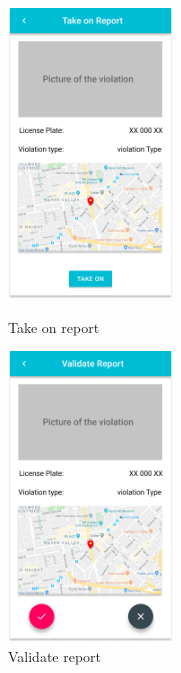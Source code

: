 \documentclass{article}
\begin{document}
\begin{figure}[!htb]
	\centering
	\begin{minipage}{.45\textwidth}
		\centering
		\includegraphics[height=7.7cm,keepaspectratio]{images/mockups/Report_Open_detail.png}
		\caption{Take on report}
	\end{minipage}%
	\begin{minipage}{.45\textwidth}
		\centering
		\includegraphics[height=7.7cm,keepaspectratio]{images/mockups/Report_Open_detail_took_on.png}
		\caption{Validate report}
	\end{minipage}
\end{figure}
\end{document}
